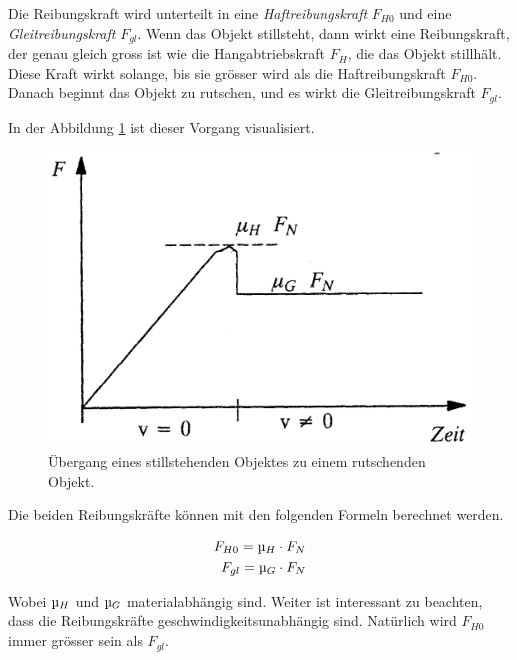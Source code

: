 Die Reibungskraft wird  unterteilt  in  eine \textit{Haftreibungskraft} $F_{H0}$
und  eine \textit{Gleitreibungskraft} $F_{gl}$. Wenn das Objekt stillsteht, dann
wirkt   eine   Reibungskraft,   der   genau   gleich   gross  ist  wie   die
Hangabtriebskraft $F_H$,  die das Objekt stillh\"alt. Diese Kraft wirkt solange,
bis sie gr\"osser wird als die Haftreibungskraft  $F_{H0}$.  Danach  beginnt das
Objekt   zu   rutschen,   und   es  wirkt   die   Gleitreibungskraft   $F_{gl}$.

In der Abbildung \ref{fig:haft_gleit_uebergang} ist dieser Vorgang visualisiert.

\begin{figure}[H]
    \centering
    \includegraphics[width=.7\linewidth]{images/haft_gleit_uebergang}
    \caption{\"Ubergang eines stillstehenden Objektes zu einem rutschenden Objekt.}
    \label{fig:haft_gleit_uebergang}
\end{figure}

Die beiden Reibungskr\"afte k\"onnen mit den folgenden Formeln berechnet werden.

\begin{align}
    F_{H0} = \micro_H\cdot F_N \\
    F_{gl} = \micro_G\cdot F_N
\end{align}

Wobei  $\micro_H$   und   $\micro_G$   materialabh\"angig  sind.  Weiter  ist
interessant  zu beachten, dass die Reibungskr\"afte geschwindigkeitsunabh\"angig
sind. Nat\"urlich wird $F_{H0}$ immer gr\"osser sein als $F_{gl}$.

